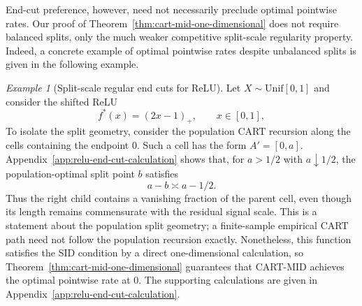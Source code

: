 \documentclass[11pt]{article}
\theoremstyle{plain}
\theoremstyle{definition}
\theoremstyle{remark}
\newtheorem{example}[theorem]{Example}
\theoremstyle{plain}
\DeclareMathOperator{\Vol}{Vol}
\newcommand{\1}{\mathbbm{1}}
\begin{document}
End-cut preference, however, need not necessarily preclude optimal pointwise rates.
Our proof of Theorem~\ref{thm:cart-mid-one-dimensional} does not require balanced splits, only the much weaker competitive split-scale regularity property.
Indeed, a concrete example of optimal pointwise rates despite unbalanced splits is given in the following example.

\begin{example}[Split-scale regular end cuts for ReLU]
\label{ex:relu}
    Let $X\sim\mathrm{Unif}[0,1]$ and consider the shifted ReLU
    \[
        f^*(x)=(2x-1)_+,
        \qquad x\in[0,1],
    \]
    To isolate the split geometry, consider the population CART recursion along the cells containing the endpoint $0$.
    Such a cell has the form $A'=[0,a]$.
    Appendix~\ref{app:relu-end-cut-calculation} shows that, for $a>1/2$ with $a\downarrow1/2$, the population-optimal split point $b$ satisfies
    \[
        a-b\asymp a-1/2.
    \]
    Thus the right child contains a vanishing fraction of the parent cell, even though its length remains commensurate with the residual signal scale.
    This is a statement about the population split geometry; a finite-sample empirical CART path need not follow the population recursion exactly.
    Nonetheless, this function satisfies the SID condition by a direct one-dimensional calculation, so Theorem~\ref{thm:cart-mid-one-dimensional} guarantees that CART-MID achieves the optimal pointwise rate at $0$.
    The supporting calculations are given in Appendix~\ref{app:relu-end-cut-calculation}.
\end{example}

\end{document}
